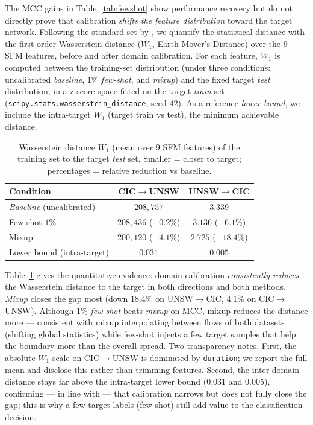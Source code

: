 \documentclass[preprint,12pt,authoryear]{elsarticle}
\begin{document}
The MCC gains in Table~\ref{tab:fewshot} show performance recovery but do not
directly prove that calibration \emph{shifts the feature distribution} toward the
target network. Following the standard set by \citet{layeghy}, we quantify the
statistical distance with the first-order Wasserstein distance ($W_1$, Earth
Mover's Distance) \citep{wasserstein} over the 9 SFM features, before and after
domain calibration. For each feature, $W_1$ is computed between the training-set
distribution (under three conditions: uncalibrated \emph{baseline}, $1\%$
\emph{few-shot}, and \emph{mixup}) and the fixed target \emph{test} distribution,
in a z-score space fitted on the target \emph{train} set
(\texttt{scipy.stats.wasserstein\_distance}, seed $42$). As a reference
\emph{lower bound}, we include the intra-target $W_1$ (target train vs test), the
minimum achievable distance.

\begin{table}[h]
\centering
\caption{Wasserstein distance $W_1$ (mean over 9 SFM features) of the training set
to the target \emph{test} set. Smaller = closer to target; percentages = relative
reduction vs baseline.}
\label{tab:wass}
\begin{tabular}{lcc}
\toprule
Condition & CIC$\rightarrow$UNSW & UNSW$\rightarrow$CIC \\
\midrule
\emph{Baseline} (uncalibrated) & $208{,}757$ & $3.339$ \\
Few-shot $1\%$        & $208{,}436$ ($-0.2\%$) & $3.136$ ($-6.1\%$) \\
Mixup                 & $200{,}120$ ($-4.1\%$) & $2.725$ ($-18.4\%$) \\
\midrule
Lower bound (intra-target) & $0.031$ & $0.005$ \\
\bottomrule
\end{tabular}
\end{table}

Table~\ref{tab:wass} gives the quantitative evidence: domain calibration
\emph{consistently reduces} the Wasserstein distance to the target in both
directions and both methods. \emph{Mixup} closes the gap most (down $18.4\%$ on
UNSW$\rightarrow$CIC, $4.1\%$ on CIC$\rightarrow$UNSW). Although $1\%$ \emph{few-shot}
beats \emph{mixup} on MCC, mixup reduces the distance more --- consistent with mixup
interpolating between flows of both datasets (shifting global statistics) while
few-shot injects a few target samples that help the boundary more than the overall
spread. Two transparency notes. First, the absolute $W_1$ scale on
CIC$\rightarrow$UNSW is dominated by \texttt{duration}; we report the full mean and
disclose this rather than trimming features. Second, the inter-domain distance stays
far above the intra-target lower bound
($0.031$ and $0.005$), confirming --- in line with \citet{layeghy} --- that
calibration narrows but does not fully close the gap; this is why a few target
labels (few-shot) still add value to the classification decision.
\end{document}
